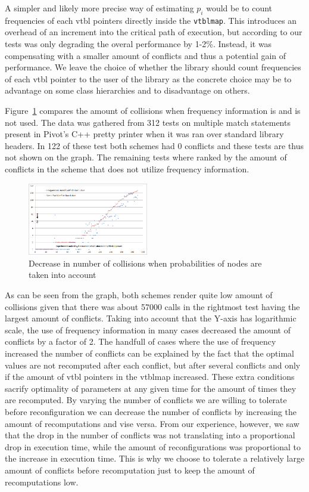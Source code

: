 \documentclass[preprint]{sigplanconf}
\makeatletter
\DeclareRobustCommand{\code}[1]{{\lstinline[breaklines=false,escapechar=@]{#1}}}
\makeatother
\begin{document}
A simpler and likely more precise way of estimating $p_i$ would be to count 
frequencies of each vtbl pointers directly inside the \code{vtblmap}. This 
introduces an overhead of an increment into the critical path of execution, but 
according to our tests was only degrading the overal performance by 1-2\%.
Instead, it was compensating with a smaller amount of conflicts and thus a 
potential gain of performance. We leave the choice of whether the library should 
count frequencies of each vtbl pointer to the user of the library as the 
concrete choice may be to advantage on some class hierarchies and to 
disadvantage on others.

Figure~\ref{fig:Collisions} compares the amount of collisions when frequency 
information is and is not used. The data was gathered from 312 tests on multiple 
match statements present in Pivot's C++ pretty printer when it was ran over 
standard library headers. In 122 of these test both schemes had 0 conflicts and 
these tests are thus not shown on the graph. The remaining tests where ranked by 
the amount of conflicts in the scheme that does not utilize frequency information.

\begin{figure}[htbp]
  \centering
    \includegraphics[width=0.47\textwidth]{CollisionsWithAndWithoutFrequencies.png}
  \caption{Decrease in number of collisions when probabilities of nodes are taken into account}
  \label{fig:Collisions}
\end{figure}

As can be seen from the graph, both schemes render quite low amount of 
collisions given that there was about 57000 calls in the rightmost test having 
the largest amount of conflicts. Taking into account that the Y-axis has 
logarithmic scale, the use of frequency information in many cases decreased the 
amount of conflicts by a factor of 2. The handfull of cases where the use of 
frequency increased the number of conflicts can be explained by the fact that 
the optimal values are not recomputed after each conflict, but after several 
conflicts and only if the amount of vtbl pointers in the vtblmap increased. These 
extra conditions sacrify optimality of parameters at any given time for the amount 
of times they are recomputed. By varying the number of conflicts we are willing 
to tolerate before reconfiguration we can decrease the number of conflicts by 
increasing the amount of recomputations and vise versa. From our experience, 
however, we saw that the drop in the number of conflicts was not translating 
into a proportional drop in execution time, while the amount of reconfigurations 
was proportional to the increase in execution time. This is why we choose to 
tolerate a relatively large amount of conflicts before recomputation just to 
keep the amount of recomputations low.
\end{document}
